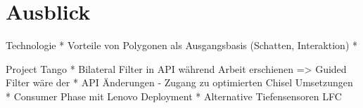 \section{Ausblick}



Technologie
* Vorteile von Polygonen als Ausgangsbasis (Schatten, Interaktion)
* 

Project Tango
* Bilateral Filter in API während Arbeit erschienen => Guided Filter wäre der
* API Änderungen - Zugang zu optimierten Chisel Umsetzungen
* Consumer Phase mit Lenovo Deployment
* Alternative Tiefensensoren LFC


	
	